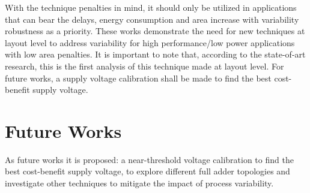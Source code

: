 \documentclass[ecp,tc, english]{iiufrgs}
\begin{document}
With the technique penalties in mind, it should only be utilized in applications that can bear the delays, energy consumption and area increase with variability robustness as a priority. These works demonstrate the need for new techniques at layout level to address variability for high performance/low power applications with low area penalties. It is important to note that, according to the state-of-art research, this is the first analysis of this technique made at layout level. For future works, a supply voltage calibration shall be made to find the best cost-benefit supply voltage.

\section{Future Works}

As future works it is proposed: a near-threshold voltage calibration to find the best cost-benefit supply voltage, to explore different full adder topologies and investigate other techniques to mitigate the impact of process variability.



\end{document}
